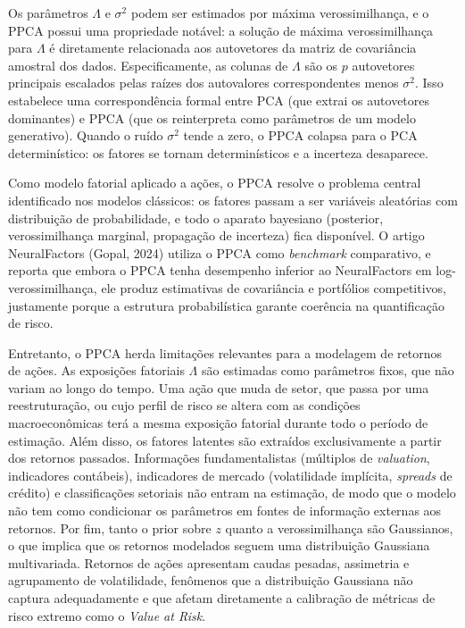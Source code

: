Os parâmetros $\Lambda$ e $\sigma^2$ podem ser estimados por máxima verossimilhança, e o PPCA possui uma propriedade notável: a solução de máxima verossimilhança para $\Lambda$ é diretamente relacionada aos autovetores da matriz de covariância amostral dos dados. Especificamente, as colunas de $\Lambda$ são os $p$ autovetores principais escalados pelas raízes dos autovalores correspondentes menos $\sigma^2$. Isso estabelece uma correspondência formal entre PCA (que extrai os autovetores dominantes) e PPCA (que os reinterpreta como parâmetros de um modelo generativo). Quando o ruído $\sigma^2$ tende a zero, o PPCA colapsa para o PCA determinístico: os fatores se tornam determinísticos e a incerteza desaparece.

Como modelo fatorial aplicado a ações, o PPCA resolve o problema central identificado nos modelos clássicos: os fatores passam a ser variáveis aleatórias com distribuição de probabilidade, e todo o aparato bayesiano (posterior, verossimilhança marginal, propagação de incerteza) fica disponível. O artigo NeuralFactors (Gopal, 2024) utiliza o PPCA como \textit{benchmark} comparativo, e reporta que embora o PPCA tenha desempenho inferior ao NeuralFactors em log-verossimilhança, ele produz estimativas de covariância e portfólios competitivos, justamente porque a estrutura probabilística garante coerência na quantificação de risco.

Entretanto, o PPCA herda limitações relevantes para a modelagem de retornos de ações. As exposições fatoriais $\Lambda$ são estimadas como parâmetros fixos, que não variam ao longo do tempo. Uma ação que muda de setor, que passa por uma reestruturação, ou cujo perfil de risco se altera com as condições macroeconômicas terá a mesma exposição fatorial durante todo o período de estimação. Além disso, os fatores latentes são extraídos exclusivamente a partir dos retornos passados. Informações fundamentalistas (múltiplos de \textit{valuation}, indicadores contábeis), indicadores de mercado (volatilidade implícita, \textit{spreads} de crédito) e classificações setoriais não entram na estimação, de modo que o modelo não tem como condicionar os parâmetros em fontes de informação externas aos retornos. Por fim, tanto o prior sobre $z$ quanto a verossimilhança são Gaussianos, o que implica que os retornos modelados seguem uma distribuição Gaussiana multivariada. Retornos de ações apresentam caudas pesadas, assimetria e agrupamento de volatilidade, fenômenos que a distribuição Gaussiana não captura adequadamente e que afetam diretamente a calibração de métricas de risco extremo como o \textit{Value at Risk}.


